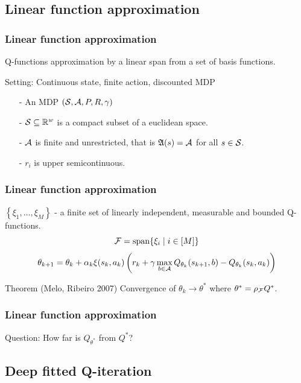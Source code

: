 \documentclass{beamer}[10]
\begin{document}
\subsection{Linear function approximation}

\begin{frame}
  \frametitle{Linear function approximation}  
  Q-functions approximation by a linear span from a set of basis functions.
  \begin{block}{Setting: Continuous state, finite action, discounted MDP}
    \leavevmode
    \begin{itemize}
      \item[-] An MDP $(\mathcal{S}, \mathcal{A}, P, R, \gamma)$
      \item[-] $\mathcal{S} \subseteq \mathbb{R}^w$ is a compact subset of a euclidean space.
      \item[-] $\mathcal{A}$ is finite and unrestricted, that
	is $\frak{A}(s) = \mathcal{A}$ for all 
	$s \in \mathcal{S}$.
      \item[-] $r_i$ is upper semicontinuous.
    \end{itemize}
  \end{block}
\end{frame}

\begin{frame}
  \frametitle{Linear function approximation}
  $\left\{ \xi_1, \dots, \xi_M \right\}$ - a finite set of linearly
  independent, measurable and bounded Q-functions.
  \[ \mathcal{F} = \mathrm{span} \{ \xi_i \mid i \in [M] \} \]
  \begin{equation*}
    \theta_{k+1} = \theta_k + \alpha_k \xi(s_k, a_k)
    \left( r_k + \gamma \max_{b \in \mathcal{A}} Q_{\theta_k}(s_{k+1}, b)
    - Q_{\theta_k}(s_k, a_k) \right)
  \end{equation*}
  \begin{block}{Theorem (Melo, Ribeiro 2007)}
    Convergence of $\theta_k \to \theta^*$
    where $\theta^* = \rho_{\mathcal{F}} Q^*$.
  \end{block}
\end{frame}

\begin{frame}
  \frametitle{Linear function approximation}
  Question: How far is $Q_{\theta^*}$ from $Q^*$?
\end{frame}

\subsection{Deep fitted Q-iteration}
\end{document}
